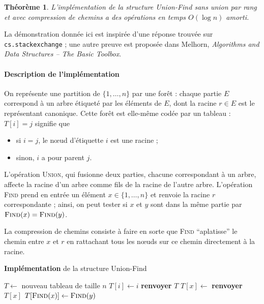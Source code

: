 \documentclass[a4paper, 11pt]{article}
\newtheorem*{theorem}{Théorème}
\begin{document}
\begin{theorem}
  L'implémentation de la structure \emph{Union-Find} sans union par rang et avec
  compression de chemins a des opérations en temps $O(\log n)$ amorti.
\end{theorem}

La démonstration donnée ici est inspirée d'une réponse trouvée sur
\texttt{cs.stackexchange} ; une autre preuve est proposée dans Melhorn,
\emph{Algorithms and Data Structures -- The Basic Toolbox}.

\paragraph{Description de l'implémentation}

On représente une partition de $\{1,\ldots,n\}$ par une forêt : chaque partie
$E$ correspond à un arbre étiqueté par les éléments de $E$, dont la racine $r
\in E$ est le représentant canonique. Cette forêt est elle-même codée par un
tableau : $T[i] = j$ signifie que
\begin{itemize}
\item si $i = j$, le nœud d'étiquette $i$ est une racine ;
\item sinon, $i$ a pour parent $j$.
\end{itemize}
L'opération \textsc{Union}, qui fusionne deux parties, chacune correspondant à
un arbre, affecte la racine d'un arbre comme fils de la racine de l'autre arbre.
L'opération \textsc{Find} prend en entrée un élément $x \in \{1, \ldots, n\}$ et
renvoie la racine $r$ correspondante ; ainsi, on peut tester si $x$ et $y$ sont
dans la même partie par $\textsc{Find}(x) = \textsc{Find}(y)$.

La compression de chemins consiste à faire en sorte que \textsc{Find}
\enquote{aplatisse} le chemin entre $x$ et $r$ en rattachant tous les nœuds sur
ce chemin directement à la racine.

\begin{algorithm}
\caption*{\textbf{Implémentation} de la structure Union-Find}
\begin{algorithmic}
\State $T \gets $ nouveau tableau de taille $n$
\State $T[i] \gets i$
\EndFor
\State \textbf{renvoyer} $T$
\EndProcedure
{}
$T[x] \gets $ 
\EndIf
\State \textbf{renvoyer} $T[x]$
\EndProcedure
{}
\State $T[\text{\Call{Find}{$x$}}] \gets \text{\Call{Find}{$y$}}$
\EndProcedure
\end{algorithmic}
\end{algorithm}
\end{document}
